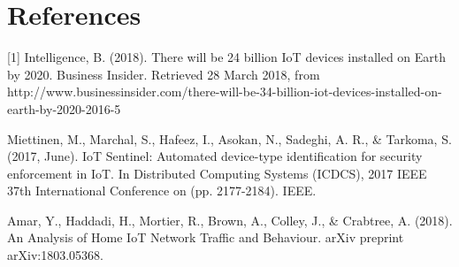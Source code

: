 \documentclass[twocolumn,10pt]{article}
\begin{document}
\section{References}
[1] Intelligence, B. (2018). There will be 24 billion IoT devices installed on Earth by 2020. Business Insider. Retrieved 28 March 2018, from http://www.businessinsider.com/there-will-be-34-billion-iot-devices-installed-on-earth-by-2020-2016-5

\newline [2] Miettinen, M., Marchal, S., Hafeez, I., Asokan, N., Sadeghi, A. R., & Tarkoma, S. (2017, June). IoT Sentinel: Automated device-type identification for security enforcement in IoT. In Distributed Computing Systems (ICDCS), 2017 IEEE 37th International Conference on (pp. 2177-2184). IEEE.

\newline [3] Amar, Y., Haddadi, H., Mortier, R., Brown, A., Colley, J., & Crabtree, A. (2018). An Analysis of Home IoT Network Traffic and Behaviour. arXiv preprint arXiv:1803.05368.

{
\footnotesize
\raggedright


}

%
\end{document}
